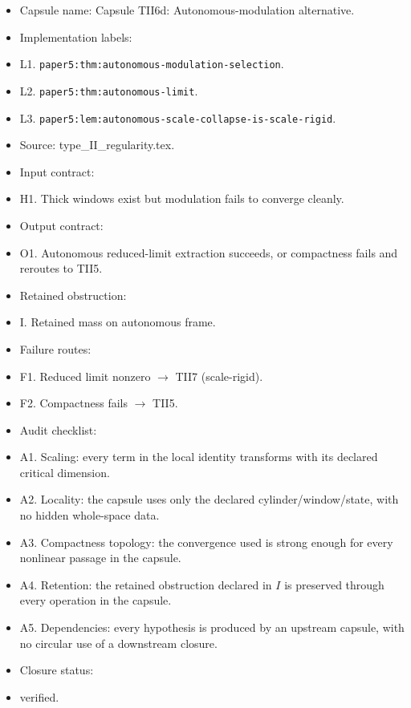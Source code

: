 \documentclass[11pt]{amsart}
\begin{document}
\begin{itemize}
  \item Capsule name: Capsule TII6d: Autonomous-modulation alternative.
  \item Implementation labels:
  \item L1. \texttt{paper5:thm:autonomous-modulation-selection}.
  \item L2. \texttt{paper5:thm:autonomous-limit}.
  \item L3. \texttt{paper5:lem:autonomous-scale-collapse-is-scale-rigid}.
  \item Source: type\_II\_regularity.tex.
  \item Input contract:
  \item H1. Thick windows exist but modulation fails to converge cleanly.
  \item Output contract:
  \item O1. Autonomous reduced-limit extraction succeeds, or compactness fails and reroutes to TII5.
  \item Retained obstruction:
  \item I. Retained mass on autonomous frame.
  \item Failure routes:
  \item F1. Reduced limit nonzero $\to$ TII7 (scale-rigid).
  \item F2. Compactness fails $\to$ TII5.
  \item Audit checklist:
  \item A1. Scaling: every term in the local identity transforms with its declared critical dimension.
  \item A2. Locality: the capsule uses only the declared cylinder/window/state, with no hidden whole-space data.
  \item A3. Compactness topology: the convergence used is strong enough for every nonlinear passage in the capsule.
  \item A4. Retention: the retained obstruction declared in $I$ is preserved through every operation in the capsule.
  \item A5. Dependencies: every hypothesis is produced by an upstream capsule, with no circular use of a downstream closure.
  \item Closure status:
  \item verified.
\end{itemize}
\end{document}
